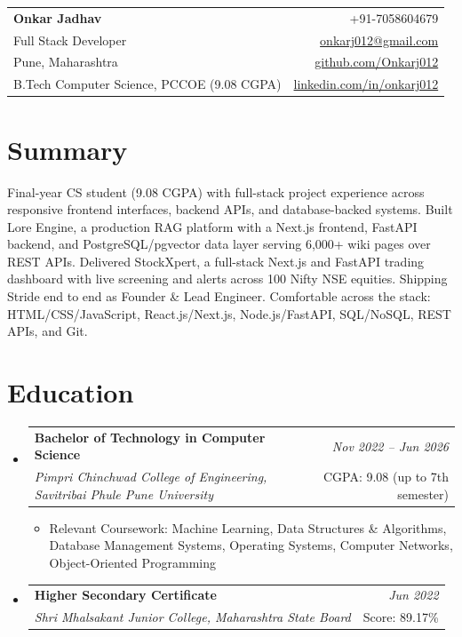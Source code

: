 \documentclass[a4paper,11pt]{article}
\makeatletter
\newcommand{\resumeSubheading}[4]{
\vspace{0.5mm}\item
    \begin{tabular*}{0.98\textwidth}[t]{l@{\extracolsep{\fill}}r}
        \textbf{#1} & \textit{\footnotesize{#4}} \\
        \textit{\footnotesize{#3}} & \footnotesize{#2}\\
    \end{tabular*}
    \vspace{-2.4mm}
}
\newcommand{\resumeSubHeadingListStart}{\begin{itemize}[leftmargin=*,labelsep=0mm]}
\newcommand{\resumeItemListStart}{\begin{justify}\begin{itemize}[leftmargin=3ex, rightmargin=2ex, noitemsep,labelsep=1.2mm,itemsep=0mm]\footnotesize}
\newcommand{\resumeSubHeadingListEnd}{\end{itemize}\vspace{2mm}}
\newcommand{\resumeItemListEnd}{\end{itemize}\end{justify}\vspace{-2mm}}
\newcommand{\name}{Onkar Jadhav}
\newcommand{\phone}{7058604679}
\newcommand{\emaila}{onkarj012@gmail.com}
\newcommand{\github}{github.com/Onkarj012}
\newcommand{\linkedin}{linkedin.com/in/onkarj012}
\makeatother
\begin{document}
\begin{tabularx}{\linewidth}{L r}
  \textbf{\Large \name} & {+91-\phone} \\
  {Full Stack Developer} & \href{mailto:\emaila}{\emaila} \\
  {Pune, Maharashtra} & \href{https://\github}{\github} \\
  {B.Tech Computer Science, PCCOE (9.08 CGPA)} & \href{https://\linkedin}{\linkedin}
\end{tabularx}
\vspace{-4mm}

\section{\textbf{Summary}}
\vspace{1mm}
\small{
Final-year CS student (9.08 CGPA) with full-stack project experience across responsive frontend interfaces, backend APIs, and database-backed systems. Built Lore Engine, a production RAG platform with a Next.js frontend, FastAPI backend, and PostgreSQL/pgvector data layer serving 6,000+ wiki pages over REST APIs. Delivered StockXpert, a full-stack Next.js and FastAPI trading dashboard with live screening and alerts across 100 Nifty NSE equities. Shipping Stride end to end as Founder \& Lead Engineer. Comfortable across the stack: HTML/CSS/JavaScript, React.js/Next.js, Node.js/FastAPI, SQL/NoSQL, REST APIs, and Git.
}
\vspace{-3mm}

\section{\textbf{Education}}
  \resumeSubHeadingListStart
    \resumeSubheading
      {Bachelor of Technology in Computer Science}{CGPA: 9.08 (up to 7th semester)}
      {Pimpri Chinchwad College of Engineering, Savitribai Phule Pune University}{Nov 2022 -- Jun 2026}
      \resumeItemListStart
        \item {Relevant Coursework: Machine Learning, Data Structures \& Algorithms, Database Management Systems, Operating Systems, Computer Networks, Object-Oriented Programming}
      \resumeItemListEnd
    \resumeSubheading
      {Higher Secondary Certificate}{Score: 89.17\%}
      {Shri Mhalsakant Junior College, Maharashtra State Board}{Jun 2022}
  \resumeSubHeadingListEnd
\vspace{-5.5mm}
\end{document}
